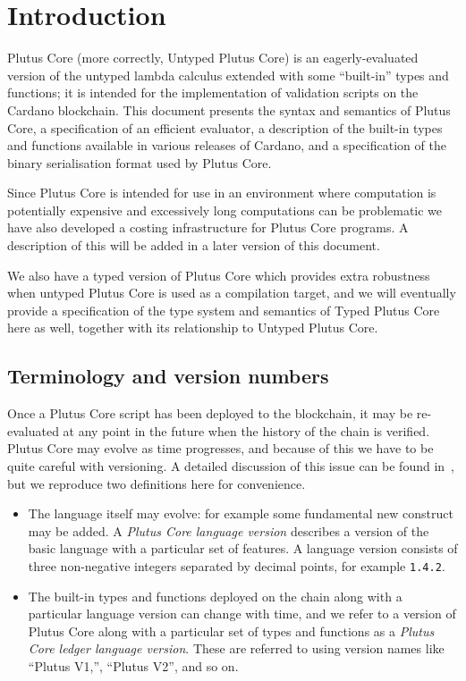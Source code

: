 \section{Introduction}
\label{sec:introduction}
Plutus Core (more correctly, Untyped Plutus Core) is an eagerly-evaluated
version of the untyped lambda calculus extended with some ``built-in'' types and
functions; it is intended for the implementation of validation scripts on the
Cardano blockchain.  This document presents the syntax and semantics of Plutus
Core, a specification of an efficient evaluator, a description of the built-in
types and functions available in various releases of Cardano, and
a specification of the binary serialisation format used by Plutus Core.

Since Plutus Core is intended for use in an environment where
computation is potentially expensive and excessively long computations can be
problematic we have also developed a costing infrastructure for Plutus Core
programs. A description of this will be added in a later version of this
document.

We also have a typed version of Plutus Core which provides extra robustness when
untyped Plutus Core is used as a compilation target, and we will eventually
provide a specification of the type system and semantics of Typed Plutus Core
here as well, together with its relationship to Untyped Plutus Core.

\subsection{Terminology and version numbers}
\label{sec:version-numbers}
Once a Plutus Core script has been deployed to the blockchain, it may be
re-evaluated at any point in the future when the history of the chain is
verified.  Plutus Core may evolve as time progresses, and because of this we
have to be quite careful with versioning.  A detailed discussion of this issue
can be found in~\cite{CIP-35}, but we reproduce two definitions here for
convenience.
\begin{itemize}
\item The language itself may evolve: for example some fundamental new construct
  may be added.  A \textit{Plutus Core language version} describes a version of
  the basic language with a particular set of features. A language version
  consists of three non-negative integers separated by decimal points, for
  example \texttt{1.4.2}.
\item The built-in types and functions deployed on the chain along with a
  particular language version can change with time, and we refer to a version of
  Plutus Core along with a particular set of types and functions as a
  \textit{Plutus Core ledger language version}.  These are referred to using
  version names like ``Plutus V1,'', ``Plutus V2'', and so on.
  \end{itemize}
 


